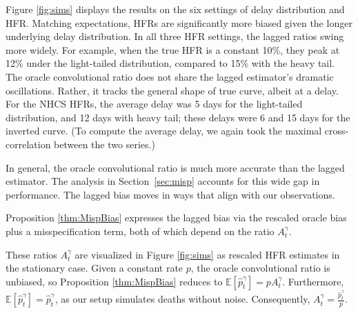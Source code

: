 \documentclass{article}
\renewcommand{\hat}{\widehat} %
\begin{document}
Figure \ref{fig:sims} displays the results on the six settings of delay distribution and HFR. 
Matching expectations, HFRs are significantly more biased given the longer underlying delay distribution. 
In all three HFR settings, the lagged ratios swing more widely. For example, when the true HFR is a constant 10\%, they peak at 12\% under the light-tailed distribution, compared to 15\% with the heavy tail. The oracle convolutional ratio does not share the lagged estimator's dramatic oscillations. Rather, it tracks the general shape of true curve, albeit at a delay. For the NHCS HFRs, the average delay was 5 days for the light-tailed distribution, and 12 days with heavy tail; these delays were 6 and 15 days for the inverted curve. (To compute the average delay, we again took the maximal cross-correlation between the two series.)

In general, the oracle convolutional ratio is much more accurate than the lagged estimator. The analysis in Section~\ref{sec:misp} accounts for this wide gap in performance. The lagged bias moves in ways that align with our observations.

Proposition \ref{thm:MispBias} expresses the lagged bias via the rescaled oracle bias plus a misspecification term, both of which depend on the ratio $A_t^\gamma$. 

These ratios $A_t^\gamma$ are visualized in Figure \ref{fig:sims} as rescaled HFR estimates in the stationary case.
Given a constant rate $p$, the oracle convolutional ratio is unbiased, so Proposition \ref{thm:MispBias} reduces to $\mathbb{E}[\hat{p}_t^\gamma] = p A_t^\gamma$. Furthermore, $\mathbb{E}[\hat{p}_t^\gamma] = \hat{p}_t^\gamma$, as our setup simulates deaths without noise. Consequently, $A_t^\gamma = \frac{\hat{p}_t^\gamma }{p}$. 
\end{document}
